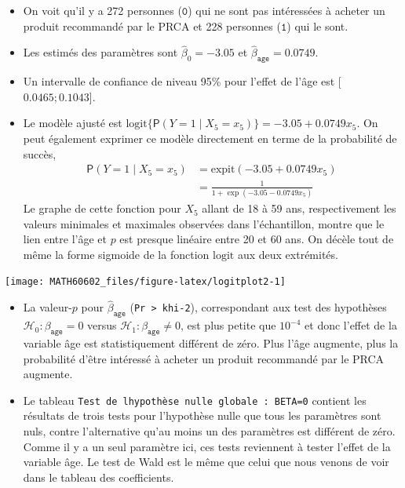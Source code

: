 \documentclass[
  11pt,
  letterpaper,
]{book}
\providecommand{\tightlist}{%
  \setlength{\itemsep}{0pt}\setlength{\parskip}{0pt}}
\theoremstyle{definition}
\theoremstyle{definition}
\theoremstyle{definition}
\theoremstyle{remark}
\begin{document}
\begin{itemize}
\tightlist
\item
  On voit qu'il y a 272 personnes (\(\texttt{0}\)) qui ne sont pas intéressées à acheter un produit recommandé par le PRCA et 228 personnes (\(\texttt{1}\)) qui le sont.
\item
  Les estimés des paramètres sont \(\widehat{\beta}_0 = -3.05\) et \(\widehat{\beta}_{\texttt{age}}=0.0749\).
\item
  Un intervalle de confiance de niveau 95\% pour l'effet de l'âge est {[}\(0.0465; 0.1043\){]}.
\item
  Le modèle ajusté est \(\mathrm{logit}\{{\mathsf P}\left(Y=1 \mid X_5=x_5\right)\} = -3.05 + 0.0749 x_5\). On peut également exprimer ce modèle directement en terme de la probabilité de succès,
  \begin{align*}
  {\mathsf P}\left(Y=1 \mid X_5=x_5\right) &= \mathrm{expit}(-3.05 + 0.0749 x_5) \\&= \frac{1}{1+\exp(-3.05 - 0.0749 x_5)}
  \end{align*}
  Le graphe de cette fonction pour \(X_5\) allant de 18 à 59 ans, respectivement les valeurs minimales et maximales observées dans l'échantillon, montre que le lien entre l'âge et \(p\) est presque linéaire entre 20 et 60 ans. On décèle tout de même la forme sigmoide de la fonction \(\mathrm{logit}\) aux deux extrémités.
\end{itemize}

\begin{center}\texttt{[image: MATH60602\_files/figure-latex/logitplot2-1]} \end{center}

\begin{itemize}
\tightlist
\item
  La valeur-\(p\) pour \(\widehat{\beta}_{\texttt{age}}\) (\texttt{Pr\ \textgreater{}\ khi-2}), correspondant aux test des hypothèses \(\mathcal{H}_0: \beta_{\texttt{age}}=0\) versus \(\mathcal{H}_1: \beta_{\texttt{age}} \neq 0\), est plus petite que \(10^{-4}\) et donc l'effet de la variable âge est statistiquement différent de zéro. Plus l'âge augmente, plus la probabilité d'être intéressé à acheter un produit recommandé par le PRCA augmente.
\item
  Le tableau \texttt{Test\ de\ l\textquotesingle{}hypothèse\ nulle\ globale\ :\ BETA=0} contient les résultats de trois tests pour l'hypothèse nulle que tous les paramètres sont nuls, contre l'alternative qu'au moins un des paramètres est différent de zéro. Comme il y a un seul paramètre ici, ces tests reviennent à tester l'effet de la variable âge. Le test de Wald est le même que celui que nous venons de voir dans le tableau des coefficients.
\end{itemize}
\end{document}
